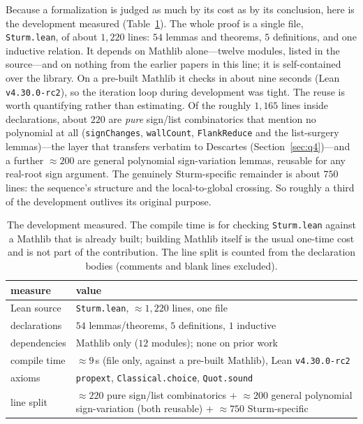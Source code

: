 \documentclass[11pt]{article}
\newcommand{\lean}[1]{\texttt{#1}}
\begin{document}
Because a formalization is judged as much by its cost as by its conclusion, here is the
development measured (Table~\ref{tab:cost}). The whole proof is a single file, \lean{Sturm.lean},
of about $1{,}220$ lines: $54$ lemmas and theorems, $5$ definitions, and one inductive relation.
It depends on Mathlib alone---twelve modules, listed in the source---and on nothing from the
earlier papers in this line; it is self-contained over the library. On a pre-built Mathlib it
checks in about nine seconds (Lean \lean{v4.30.0-rc2}), so the iteration loop during development
was tight. The reuse is worth quantifying rather than estimating. Of the roughly $1{,}165$ lines
inside declarations, about $220$ are \emph{pure} sign/list combinatorics that mention no polynomial
at all (\lean{signChanges}, \lean{wallCount}, \lean{FlankReduce} and the list-surgery lemmas)---the
layer that transfers verbatim to Descartes (Section~\ref{sec:q4})---and a further $\approx 200$ are
general polynomial sign-variation lemmas, reusable for any real-root sign argument. The genuinely
Sturm-specific remainder is about $750$ lines: the sequence's structure and the local-to-global
crossing. So roughly a third of the development outlives its original purpose.

\begin{table}[h]
\centering\small
{}
\begin{tabular}{@{}l p{}@{}}
\toprule
\rowcolor{ggteal!18} measure & value \\
\midrule
Lean source & \lean{Sturm.lean}, $\approx 1{,}220$ lines, one file \\
declarations & $54$ lemmas/theorems, $5$ definitions, $1$ inductive \\
dependencies & Mathlib only ($12$ modules); none on prior work \\
compile time & $\approx 9$\,s (file only, against a pre-built Mathlib), Lean \lean{v4.30.0-rc2} \\
axioms & \lean{propext}, \lean{Classical.choice}, \lean{Quot.sound} \\
line split & $\approx 220$ pure sign/list combinatorics $+$ $\approx 200$ general polynomial sign-variation (both reusable) $+$ $\approx 750$ Sturm-specific \\
\bottomrule
\end{tabular}
\caption{The development measured. The compile time is for checking \lean{Sturm.lean} against a
Mathlib that is already built; building Mathlib itself is the usual one-time cost and is not part of
the contribution. The line split is counted from the declaration bodies (comments and blank lines
excluded).}
\label{tab:cost}
\end{table}
\end{document}
